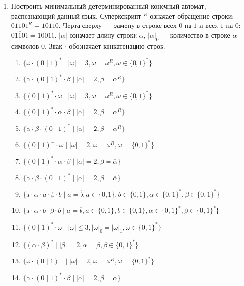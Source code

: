 \documentclass[12pt]{article}
\begin{document}
\begin{enumerate}
  \item Построить минимальный детерминированный конечный автомат, распознающий данный язык. Суперкскрипт $^R$ означает обращение строки: $01101^R = 10110$. Черта сверху~--- замену в строке всех $0$ на $1$ и всех $1$ на $0$: $\overline{01101} = 10010$. $|\alpha|$ означает длину строки $\alpha$, $|\alpha|_0$ --- количество в строке $\alpha$ символов $0$. Знак $\cdot$ обозначает конкатенацию строк.
  \begin{enumerate}[label=\arabic*)]
    \setlength\itemsep{0.8em}
    \item $\{\omega \cdot (0 \mid 1)^* \mid |\omega| = 3, \omega = \omega^R, \omega \in \{0, 1\}^*\}$
    \item $\{ \alpha \cdot (0 \mid 1)^* \cdot \beta \mid |\alpha| = 2, \beta = \alpha^R \}$
    \item $\{(0 \mid 1)^* \cdot \omega \mid |\omega| = 3, \omega = \omega^R, \omega \in \{0, 1\}^*\}$
    \item $\{ (0 \mid 1)^* \cdot \alpha \cdot \beta \mid |\alpha| = 2, \beta = \alpha^R \}$
    \item $\{ \alpha \cdot \beta \cdot (0 \mid 1)^* \mid |\alpha| = 2, \beta = \alpha^R \}$
    \item $\{(0 \mid 1)^+ \cdot \omega \mid |\omega| = 2, \omega = \omega^R, \omega = \{0, 1\}^*\}$
    \item $\{ (0 \mid 1)^* \cdot \alpha \cdot \beta \mid |\alpha| = 2, \beta = \overline{\alpha} \}$
    \item $\{ \alpha \cdot \beta \cdot (0 \mid 1)^* \mid |\alpha| = 2, \beta = \overline{\alpha} \}$
    \item $\{ a \cdot \alpha \cdot a \cdot \beta \cdot b \mid a = \overline{b}, a \in \{0,1\}, b \in \{0, 1\}, \alpha \in \{0, 1\}^*, \beta \in \{0, 1\}^*\}$
    \item $\{ a \cdot \alpha \cdot b \cdot \beta \cdot b \mid a = \overline{b}, a \in \{0,1\}, b \in \{0, 1\}, \alpha \in \{0, 1\}^*, \beta \in \{0, 1\}^*\}$
    \item $\{(0 \mid 1)^* \cdot \omega \mid |\omega| \le 3, |\omega|_0 = |\omega|_1, \omega \in \{0, 1\}^*\}$
    \item $\{ (\alpha \cdot \beta)^* \mid |\beta| = 2, \alpha = \overline{\beta}, \beta \in \{0, 1\}^* \}$
    \item $\{\omega \cdot (0 \mid 1)^+ \mid |\omega| = 2, \omega = \omega^R, \omega = \{0, 1\}^*\}$
    \item $\{ \alpha \cdot (0 \mid 1)^* \cdot \beta \mid |\alpha| = 2, \beta = \overline{\alpha} \}$
  \end{enumerate}


\end{enumerate}
\end{document}
